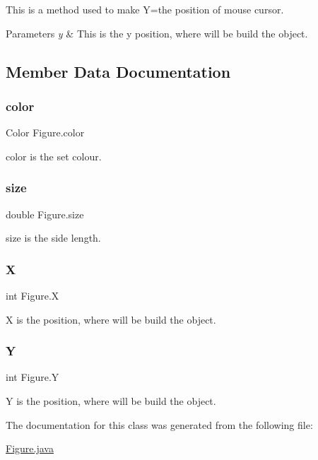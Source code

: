 This is a method used to make Y=the position of mouse cursor. 
\begin{DoxyParams}{Parameters}
{\em y} & This is the y position, where will be build the object. \\
\hline
\end{DoxyParams}


\subsection{Member Data Documentation}
\mbox{\label{class_figure_a264181e47dd7b6155b4df4a772c2fd46}} 
\subsubsection{\texorpdfstring{color}{color}}
{\footnotesize\ttfamily Color Figure.\+color\hspace{0.3cm}{\ttfamily [protected]}}

color is the set colour. \mbox{\label{class_figure_a538152f79733ae6b690797afd69aab57}} 
\subsubsection{\texorpdfstring{size}{size}}
{\footnotesize\ttfamily double Figure.\+size\hspace{0.3cm}{\ttfamily [protected]}}

size is the side length. \mbox{\label{class_figure_a51f58aeb00bfc8076424277e98dd3671}} 
\subsubsection{\texorpdfstring{X}{X}}
{\footnotesize\ttfamily int Figure.\+X\hspace{0.3cm}{\ttfamily [protected]}}

X is the position, where will be build the object. \mbox{\label{class_figure_a7a254120a4c69fb73048cfc9fdcdeebb}} 
\subsubsection{\texorpdfstring{Y}{Y}}
{\footnotesize\ttfamily int Figure.\+Y\hspace{0.3cm}{\ttfamily [protected]}}

Y is the position, where will be build the object. 

The documentation for this class was generated from the following file\+:\begin{DoxyCompactItemize}
\item 
\mbox{\hyperlink{_figure_8java}{Figure.\+java}}\end{DoxyCompactItemize}
